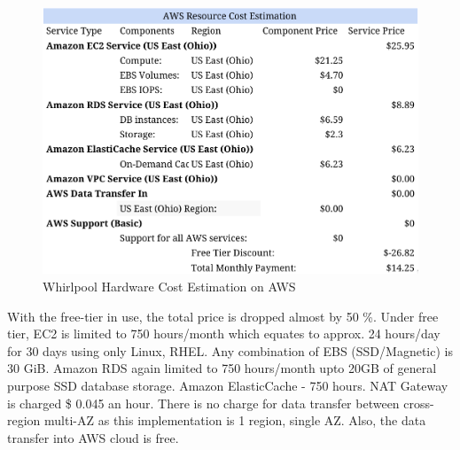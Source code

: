 \begin{figure}[h!]
  \centering
  \includegraphics[width=12cm,height=8cm,keepaspectratio]{../media/crawler/aws-resource-cost-estimation.png}
  \caption{Whirlpool Hardware Cost Estimation on AWS}
  \label{fig:awscost}
\end{figure}

\noindent
With the free-tier in use, the total price is dropped almost by 50 \%. Under free tier, EC2 is limited to 750 hours/month which equates to approx. 24 hours/day for 30 days using only Linux, RHEL. Any combination of EBS (SSD/Magnetic) is 30 GiB. Amazon RDS again limited to 750 hours/month upto 20GB of general purpose SSD database
storage. Amazon ElasticCache - 750 hours. NAT Gateway is charged \$ 0.045 an hour. There is no charge for data transfer between cross-region multi-AZ as this implementation is 1 region, single AZ. Also, the data 
transfer into AWS cloud is free.

\pagebreak

